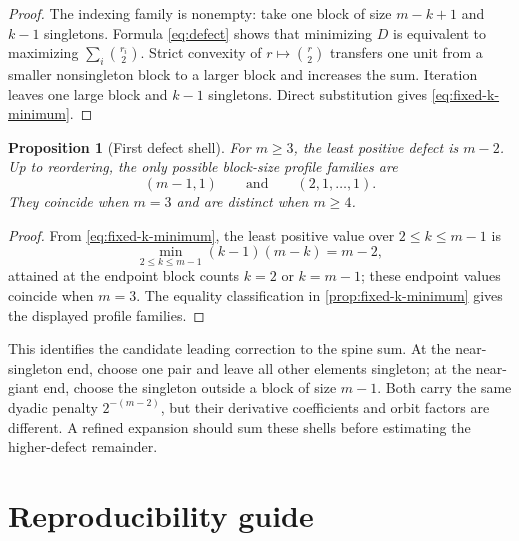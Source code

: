 \documentclass[11pt,oneside]{article}
\newtheorem{proposition}[theorem]{Proposition}
\theoremstyle{definition}
\theoremstyle{remark}
\begin{document}
\begin{proof}
The indexing family is nonempty: take one block of size $m-k+1$ and $k-1$
singletons.  Formula \eqref{eq:defect} shows that minimizing $D$ is equivalent to
maximizing $\sum_i\binom{r_i}{2}$.  Strict convexity of $r\mapsto\binom r2$ transfers
one unit from a smaller nonsingleton block to a larger block and increases the sum.
Iteration leaves one large block and $k-1$ singletons.  Direct substitution gives
\eqref{eq:fixed-k-minimum}.
\end{proof}

\begin{proposition}[First defect shell]
\label{prop:first-shell}
For $m\geq3$, the least positive defect is $m-2$.  Up to reordering, the only
possible block-size profile families are
\begin{equation}
 (m-1,1)
 \qquad\text{and}\qquad
 (2,1,\ldots,1).
 \label{eq:first-shell}
\end{equation}
They coincide when $m=3$ and are distinct when $m\geq4$.
\end{proposition}

\begin{proof}
From \eqref{eq:fixed-k-minimum}, the least positive value over $2\leq k\leq m-1$ is
\[
 \min_{2\leq k\leq m-1}(k-1)(m-k)=m-2,
\]
attained at the endpoint block counts $k=2$ or $k=m-1$; these endpoint values
coincide when $m=3$.  The equality classification in
\cref{prop:fixed-k-minimum} gives the displayed profile families.
\end{proof}

This identifies the candidate leading correction to the spine sum.  At the
near-singleton end, choose one pair and leave all other elements singleton; at the
near-giant end, choose the singleton outside a block of size $m-1$.  Both carry the
same dyadic penalty $2^{-(m-2)}$, but their derivative coefficients and orbit factors
are different.  A refined expansion should sum these shells before estimating the
higher-defect remainder.

\section{Reproducibility guide}
\label{app:reproducibility}
\end{document}
